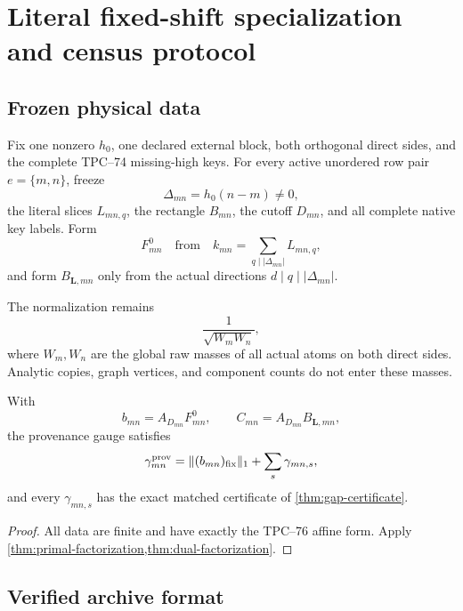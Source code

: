 \section{Literal fixed-shift specialization and census protocol}
\label{sec:physical-census}

\subsection{Frozen physical data}

Fix one nonzero \(h_0\), one declared external block, both orthogonal
direct sides, and the complete TPC--74 missing-high keys. For every
active unordered row pair \(e=\{m,n\}\), freeze
\[
 \Delta_{mn}=h_0(n-m)\ne0,
\]
the literal slices \(L_{mn,q}\), the rectangle \(B_{mn}\), the cutoff
\(D_{mn}\), and all complete native key labels. Form
\[
 F^0_{mn}
 \quad\text{from}\quad
 k_{mn}=\sum_{q\mid|\Delta_{mn}|}L_{mn,q},
\]
and form \(B_{\boldsymbol L,mn}\) only from the actual directions
\(d\mid q\mid|\Delta_{mn}|\).

The normalization remains
\[
 \frac1{\sqrt{W_mW_n}},
\]
where \(W_m,W_n\) are the global raw masses of all actual atoms on both
direct sides. Analytic copies, graph vertices, and component counts do
not enter these masses.

\begin{corollary}
\label{cor:literal-edge-decomposition}
With
\[
 b_{mn}=A_{D_{mn}}F^0_{mn},
 \qquad
 C_{mn}=A_{D_{mn}}B_{\boldsymbol L,mn},
\]
the provenance gauge satisfies
\[
 \gamma^{\rm prov}_{mn}
 =
 \|(b_{mn})_{\rm fix}\|_1
 +
 \sum_s\gamma_{mn,s},
\]
and every \(\gamma_{mn,s}\) has the exact matched certificate of
\cref{thm:gap-certificate}.
\end{corollary}

\begin{proof}
All data are finite and have exactly the TPC--76 affine form. Apply
\cref{thm:primal-factorization,thm:dual-factorization}.
\end{proof}

\subsection{Verified archive format}

